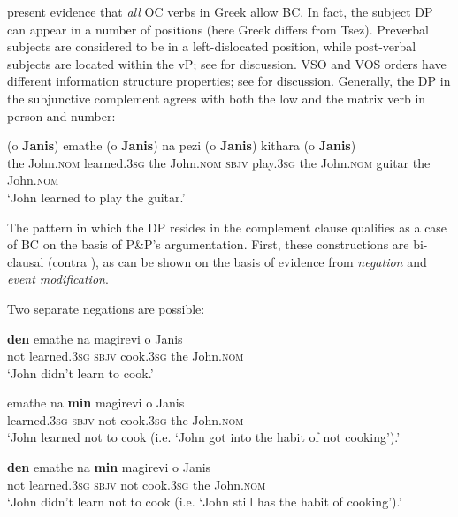 \documentclass[output=paper]{langsci/langscibook}
\begin{document}
\citet{Alexiadou2010} present evidence that \emph{all} OC verbs in Greek allow BC. In fact, the subject DP can appear in a number of positions (here Greek differs from Tsez). Preverbal subjects are considered to be in a left-dislocated position, while post-verbal subjects are located within the vP; see \citet{Alexiadou1998} for discussion. VSO and VOS orders have different information structure properties; see \citet{Alexiadou1999,Alexiadou2000} for discussion.  Generally, the DP in the subjunctive complement agrees with both the low and the matrix verb in person and number:



\ea%
    \label{ex:alexiadou:6}
    \gll (o \textbf{Janis}) emathe (o \textbf{Janis}) na pezi  (o \textbf{Janis}) kithara (o \textbf{Janis})\\
         the John.\textsc{nom} learned.\textsc{3sg} the John.\textsc{nom} \textsc{sbjv} play.\textsc{3sg} the John.\textsc{nom} guitar the John.\textsc{nom}\\
    \glt    ‘John learned to play the guitar.’
    \z

The pattern in which the DP resides in the complement clause qualifies as a case of BC on the basis of P\&P’s argumentation. First, these constructions are bi-clausal (contra \citealt{Roussou2009}), as can be shown on the basis of evidence from \textit{negation} and \textit{event modification}.

Two separate negations are possible:

\ea%
    \label{ex:alexiadou:7}
\ea
\gll    \textbf{den}  emathe    na    magirevi   o    Janis\\
    not   learned.\textsc{3sg}  \textsc{sbjv}  cook.\textsc{3sg}    the    John.\textsc{nom}\\
\glt    ‘John didn’t learn to cook.’

\ex
\gll    emathe     na   \textbf{min}   magirevi    o    Janis\\
    learned.\textsc{3sg}  \textsc{sbjv} not  cook.\textsc{3sg} the   John.\textsc{nom}\\
\glt ‘John learned not to cook (i.e. ‘John got into the habit of not cooking’).’

\ex
\gll    \textbf{den}   emathe    na   \textbf{min} magirevi    o    Janis\\
    not  learned.\textsc{3sg}  \textsc{sbjv} not  cook.\textsc{3sg}    the   John.\textsc{nom}\\
\glt    ‘John didn’t learn not to cook (i.e. ‘John still has the habit of cooking’).’
\z
\z
\end{document}
